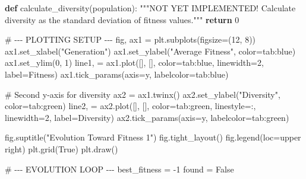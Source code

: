 \documentclass[
  letterpaper,
  DIV=11,
  numbers=noendperiod]{scrreprt}
\newenvironment{Shaded}{\begin{snugshade}}{\end{snugshade}}
\newcommand{\CommentTok}[1]{\textcolor[rgb]{0.37,0.37,0.37}{#1}}
\newcommand{\ControlFlowTok}[1]{\textcolor[rgb]{0.00,0.23,0.31}{\textbf{#1}}}
\newcommand{\DecValTok}[1]{\textcolor[rgb]{0.68,0.00,0.00}{#1}}
\newcommand{\KeywordTok}[1]{\textcolor[rgb]{0.00,0.23,0.31}{\textbf{#1}}}
\newcommand{\NormalTok}[1]{\textcolor[rgb]{0.00,0.23,0.31}{#1}}
\newcommand{\OperatorTok}[1]{\textcolor[rgb]{0.37,0.37,0.37}{#1}}
\newcommand{\StringTok}[1]{\textcolor[rgb]{0.13,0.47,0.30}{#1}}
\newcommand{\VariableTok}[1]{\textcolor[rgb]{0.07,0.07,0.07}{#1}}
\theoremstyle{definition}
\theoremstyle{remark}
\begin{document}
\begin{tcolorbox}
\begin{Shaded}
\begin{Highlighting}[]
\KeywordTok{def}\NormalTok{ calculate\_diversity(population):}
    \CommentTok{"""NOT YET IMPLEMENTED! Calculate diversity as the standard deviation of fitness values."""}
    \ControlFlowTok{return} \DecValTok{0} 

\CommentTok{\# {-}{-}{-} PLOTTING SETUP {-}{-}{-}}
\NormalTok{fig, ax1 }\OperatorTok{=}\NormalTok{ plt.subplots(figsize}\OperatorTok{=}\NormalTok{(}\DecValTok{12}\NormalTok{, }\DecValTok{8}\NormalTok{))}
\NormalTok{ax1.set\_xlabel(}\StringTok{"Generation"}\NormalTok{)}
\NormalTok{ax1.set\_ylabel(}\StringTok{"Average Fitness"}\NormalTok{, color}\OperatorTok{=}\StringTok{\textquotesingle{}tab:blue\textquotesingle{}}\NormalTok{)}
\NormalTok{ax1.set\_ylim(}\DecValTok{0}\NormalTok{, }\DecValTok{1}\NormalTok{)}
\NormalTok{line1, }\OperatorTok{=}\NormalTok{ ax1.plot([], [], color}\OperatorTok{=}\StringTok{\textquotesingle{}tab:blue\textquotesingle{}}\NormalTok{, linewidth}\OperatorTok{=}\DecValTok{2}\NormalTok{, label}\OperatorTok{=}\StringTok{\textquotesingle{}Fitness\textquotesingle{}}\NormalTok{)}
\NormalTok{ax1.tick\_params(axis}\OperatorTok{=}\StringTok{\textquotesingle{}y\textquotesingle{}}\NormalTok{, labelcolor}\OperatorTok{=}\StringTok{\textquotesingle{}tab:blue\textquotesingle{}}\NormalTok{)}

\CommentTok{\# Second y{-}axis for diversity}
\NormalTok{ax2 }\OperatorTok{=}\NormalTok{ ax1.twinx()}
\NormalTok{ax2.set\_ylabel(}\StringTok{"Diversity"}\NormalTok{, color}\OperatorTok{=}\StringTok{\textquotesingle{}tab:green\textquotesingle{}}\NormalTok{)}
\NormalTok{line2, }\OperatorTok{=}\NormalTok{ ax2.plot([], [], color}\OperatorTok{=}\StringTok{\textquotesingle{}tab:green\textquotesingle{}}\NormalTok{, linestyle}\OperatorTok{=}\StringTok{\textquotesingle{}:\textquotesingle{}}\NormalTok{, linewidth}\OperatorTok{=}\DecValTok{2}\NormalTok{, label}\OperatorTok{=}\StringTok{\textquotesingle{}Diversity\textquotesingle{}}\NormalTok{)}
\NormalTok{ax2.tick\_params(axis}\OperatorTok{=}\StringTok{\textquotesingle{}y\textquotesingle{}}\NormalTok{, labelcolor}\OperatorTok{=}\StringTok{\textquotesingle{}tab:green\textquotesingle{}}\NormalTok{)}

\NormalTok{fig.suptitle(}\StringTok{"Evolution Toward Fitness 1"}\NormalTok{)}
\NormalTok{fig.tight\_layout()}
\NormalTok{fig.legend(loc}\OperatorTok{=}\StringTok{\textquotesingle{}upper right\textquotesingle{}}\NormalTok{)}
\NormalTok{plt.grid(}\VariableTok{True}\NormalTok{)}
\NormalTok{plt.draw()}

\CommentTok{\# {-}{-}{-} EVOLUTION LOOP {-}{-}{-}}
\NormalTok{best\_fitness }\OperatorTok{=} \OperatorTok{{-}}\DecValTok{1}
\NormalTok{found }\OperatorTok{=} \VariableTok{False}


\end{Highlighting}
\end{Shaded}
\end{tcolorbox}
\end{document}
